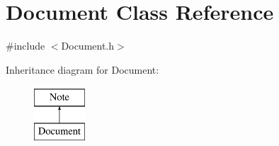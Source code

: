 \hypertarget{classDocument}{\section{\-Document \-Class \-Reference}
\label{classDocument}
}


{\ttfamily \#include $<$\-Document.\-h$>$}

\-Inheritance diagram for \-Document\-:\begin{figure}[H]
\begin{center}
\leavevmode
\includegraphics[height=2.000000cm]{classDocument}
\end{center}
\end{figure}

